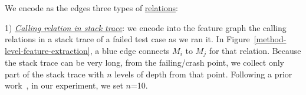 

We encode as the edges three types of \underline{relations}:

1) {\em \underline{Calling relation in stack trace}}: we encode into
the feature graph the calling relations in a stack trace of a failed
test case as we ran it.
%
In Figure~\ref{method-level-feature-extraction}, a blue edge connects
$M_i$ to $M_j$ for that relation.
Because the stack trace can be very long, from the failing/crash
point, we collect only part of the stack trace with $n$ levels of
depth from that point. Following a prior
work~\cite{crashlocator-issta14}, in our experiment, we set $n$=10.

